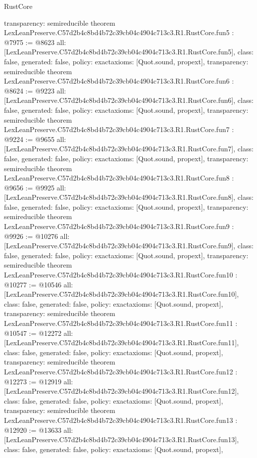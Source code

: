 \begin{lexlean}{RustCore}
\begin{coremodule}
{  transparency: semireducible
}
theorem LexLeanPreserve.C57d2b4c8bd4b72c39cb04c4904c713c3.R1.RustCore.fun5 : @7975 := @8623 {
  all: [LexLeanPreserve.C57d2b4c8bd4b72c39cb04c4904c713c3.R1.RustCore.fun5],
  class: false,
  generated: false,
  policy: exact{axioms: [Quot.sound, propext]},
  transparency: semireducible
}
theorem LexLeanPreserve.C57d2b4c8bd4b72c39cb04c4904c713c3.R1.RustCore.fun6 : @8624 := @9223 {
  all: [LexLeanPreserve.C57d2b4c8bd4b72c39cb04c4904c713c3.R1.RustCore.fun6],
  class: false,
  generated: false,
  policy: exact{axioms: [Quot.sound, propext]},
  transparency: semireducible
}
theorem LexLeanPreserve.C57d2b4c8bd4b72c39cb04c4904c713c3.R1.RustCore.fun7 : @9224 := @9655 {
  all: [LexLeanPreserve.C57d2b4c8bd4b72c39cb04c4904c713c3.R1.RustCore.fun7],
  class: false,
  generated: false,
  policy: exact{axioms: [Quot.sound, propext]},
  transparency: semireducible
}
theorem LexLeanPreserve.C57d2b4c8bd4b72c39cb04c4904c713c3.R1.RustCore.fun8 : @9656 := @9925 {
  all: [LexLeanPreserve.C57d2b4c8bd4b72c39cb04c4904c713c3.R1.RustCore.fun8],
  class: false,
  generated: false,
  policy: exact{axioms: [Quot.sound, propext]},
  transparency: semireducible
}
theorem LexLeanPreserve.C57d2b4c8bd4b72c39cb04c4904c713c3.R1.RustCore.fun9 : @9926 := @10276 {
  all: [LexLeanPreserve.C57d2b4c8bd4b72c39cb04c4904c713c3.R1.RustCore.fun9],
  class: false,
  generated: false,
  policy: exact{axioms: [Quot.sound, propext]},
  transparency: semireducible
}
theorem LexLeanPreserve.C57d2b4c8bd4b72c39cb04c4904c713c3.R1.RustCore.fun10 : @10277 := @10546 {
  all: [LexLeanPreserve.C57d2b4c8bd4b72c39cb04c4904c713c3.R1.RustCore.fun10],
  class: false,
  generated: false,
  policy: exact{axioms: [Quot.sound, propext]},
  transparency: semireducible
}
theorem LexLeanPreserve.C57d2b4c8bd4b72c39cb04c4904c713c3.R1.RustCore.fun11 : @10547 := @12272 {
  all: [LexLeanPreserve.C57d2b4c8bd4b72c39cb04c4904c713c3.R1.RustCore.fun11],
  class: false,
  generated: false,
  policy: exact{axioms: [Quot.sound, propext]},
  transparency: semireducible
}
theorem LexLeanPreserve.C57d2b4c8bd4b72c39cb04c4904c713c3.R1.RustCore.fun12 : @12273 := @12919 {
  all: [LexLeanPreserve.C57d2b4c8bd4b72c39cb04c4904c713c3.R1.RustCore.fun12],
  class: false,
  generated: false,
  policy: exact{axioms: [Quot.sound, propext]},
  transparency: semireducible
}
theorem LexLeanPreserve.C57d2b4c8bd4b72c39cb04c4904c713c3.R1.RustCore.fun13 : @12920 := @13633 {
  all: [LexLeanPreserve.C57d2b4c8bd4b72c39cb04c4904c713c3.R1.RustCore.fun13],
  class: false,
  generated: false,
  policy: exact{axioms: [Quot.sound, propext]},
}
\end{coremodule}
\end{lexlean}
